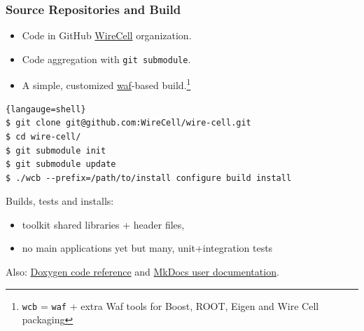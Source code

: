 \documentclass[xcolor=dvipsnames]{beamer}
\begin{document}
\begin{frame}[fragile]
  \frametitle{Source Repositories and Build}

  \begin{itemize}
  \item Code in GitHub \href{https://github.com/WireCell/}{WireCell} organization.
  \item Code aggregation with \texttt{git submodule}.
  \item A simple, customized \href{https://waf.io/}{waf}-based build.\footnote{\texttt{wcb} = \texttt{waf} + extra Waf tools for Boost, ROOT, Eigen and Wire Cell packaging}
  

  \end{itemize}

  \begin{lstlisting}{langauge=shell}
$ git clone git@github.com:WireCell/wire-cell.git
$ cd wire-cell/
$ git submodule init
$ git submodule update
$ ./wcb --prefix=/path/to/install configure build install
  \end{lstlisting}

  Builds, tests and installs:
  \begin{itemize}
  \item toolkit shared libraries + header files,
  \item no main applications yet but many, unit+integration tests
  \end{itemize}
  Also: \href{http://www.phy.bnl.gov/wire-cell/doxy/html/}{Doxygen code reference} and \href{http://wirecell.github.io/wire-cell-docs/}{MkDocs user documentation}.


\end{frame}
\end{document}
